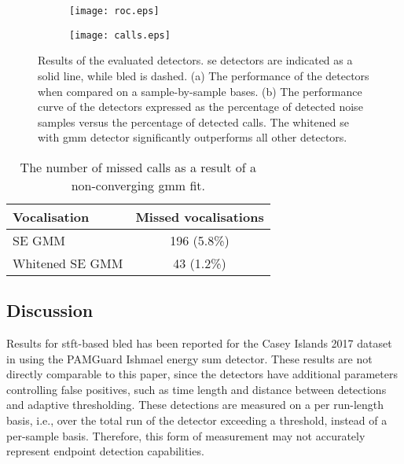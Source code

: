 {\begin{figure}[h]
     \centering
     \begin{subfigure}[t]{0.45\textwidth}
    \centering
    \texttt{[image: roc.eps]}    
     \caption{} \label{fig:det_roc}
     \end{subfigure}
     \begin{subfigure}[t]{0.45\textwidth}
    \centering
    \texttt{[image: calls.eps]}    
    \caption{} \label{fig:det_calls}
     \end{subfigure}
     \caption[ROC curves of the evaluated detectors.]{Results of the evaluated detectors. \ac{se} detectors are indicated as a solid line, while \ac{bled} is dashed. (a) The performance of the detectors when compared on a sample-by-sample bases. (b) The performance curve of the detectors expressed as the percentage of detected noise samples versus the percentage of detected calls. The whitened \ac{se} with \ac{gmm} detector significantly outperforms all other detectors.}
\end{figure}


\begin{table}[h] 
    \centering
\caption{The number of missed calls as a result of a non-converging \ac{gmm} fit.}
\label{tab:convergence}
\begin{tabular}{lc} 
\hline
\textbf{Vocalisation}       & \textbf{Missed vocalisations}  \\ \hline
SE GMM                      & 196 (5.8\%)                      \\
Whitened SE GMM             & 43 (1.2\%)                    \\ \hline
\end{tabular}
\end{table}





\subsection{Discussion}

Results for \ac{stft}-based \ac{bled} has been reported for the Casey Islands 2017 dataset in \citep{casey2017} using the PAMGuard Ishmael energy sum detector. These results are not directly comparable to this paper, since the detectors have additional parameters controlling false positives, such as time length and distance between detections and adaptive thresholding. These detections are measured on a per run-length basis, i.e., over the total run of the detector exceeding a threshold, instead of a per-sample basis. Therefore, this form of measurement may not accurately represent endpoint detection capabilities. 

}
